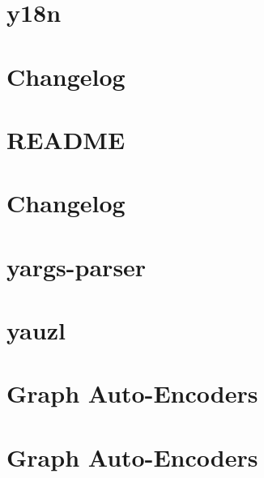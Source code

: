 \documentclass[twoside]{book}
\newcommand{\+}{\discretionary{\mbox{\scriptsize$\hookleftarrow$}}{}{}}
\begin{document}
\chapter{y18n}
\label{md_dsmacc_examples_DRmerge_node_modules_y18n_README}

\chapter{Changelog}
\label{md_dsmacc_examples_DRmerge_node_modules_yargs_CHANGELOG}

\chapter{R\+E\+A\+D\+ME}
\label{md_dsmacc_examples_DRmerge_node_modules_yargs_README}

\chapter{Changelog}
\label{md_dsmacc_examples_DRmerge_node_modules_yargs-parser_CHANGELOG}

\chapter{yargs-\/parser}
\label{md_dsmacc_examples_DRmerge_node_modules_yargs-parser_README}

\chapter{yauzl}
\label{md_dsmacc_examples_DRmerge_node_modules_yauzl_README}

\chapter{Graph Auto-\/\+Encoders}
\label{md_dsmacc_examples_gae_README}

\chapter{Graph Auto-\/\+Encoders}
\label{md_dsmacc_examples_gaeold_README}

\end{document}
